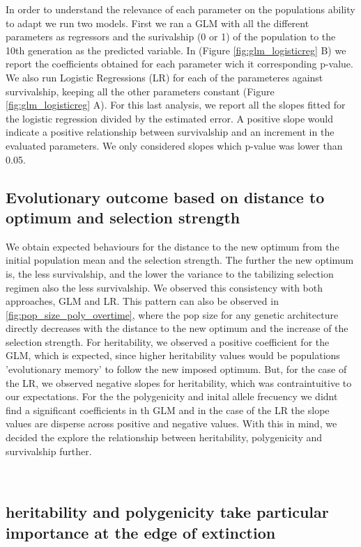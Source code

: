 \documentclass{article}
\begin{document}
In order to understand the relevance of each parameter on the populations ability to adapt we run two models. First we ran a GLM with all the different parameters as regressors and the surivalship (0 or 1) of the population to the 10th generation as the predicted variable. In (Figure \ref{fig:glm_logisticreg} B) we report the coefficients obtained for each parameter wich it corresponding p-value. We also run Logistic Regressions (LR) for each of the parameteres against survivalship, keeping all the other parameters constant (Figure \ref{fig:glm_logisticreg} A). For this last analysis, we report all the slopes fitted for the logistic regression divided by the estimated error. A positive slope would indicate a positive relationship between survivalship and an increment in the evaluated parameters. We only considered slopes which p-value was lower than 0.05. 
\\
\subsection{Evolutionary outcome based on distance to optimum and selection strength}
We obtain expected behaviours for the distance to the new optimum from the initial population mean and the selection strength. The further the new optimum is, the less survivalship, and the lower the variance to the tabilizing selection regimen also the less survivalship. We observed this consistency with both approaches, GLM and LR. This pattern can also be observed in \ref{fig:pop_size_poly_overtime}, where the pop size for any genetic architecture directly decreases with the distance to the new optimum and the increase of the selection strength.  For heritability, we observed a positive coefficient for the GLM, which is expected, since higher heritability values would be populations 'evolutionary memory' to follow the new imposed optimum. But, for the case of the LR, we observed negative slopes for heritability, which was contraintuitive to our expectations. For the the polygenicity and inital allele frecuency we didnt find a significant coefficients in th GLM and in the case of the LR the slope values are disperse across positive and negative values. With this in mind, we decided the explore the relationship between heritability, polygenicity and survivalship further.

\\
\subsection{heritability and polygenicity take particular importance at the edge of extinction}
\end{document}
